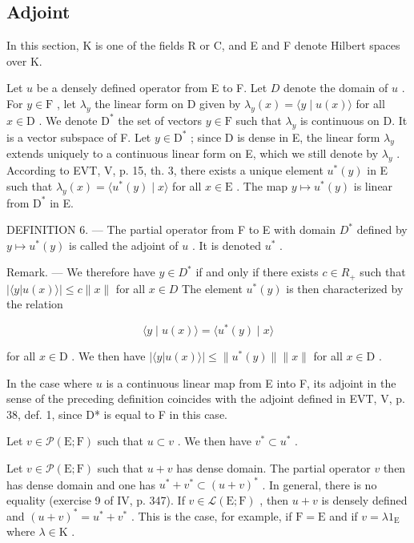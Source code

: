\subsection{Adjoint}

In this section, K is one of the fields R or C, and E and F denote Hilbert spaces over K.

Let \(u\) be a densely defined operator from E to F. Let \(D\) denote the domain of \(u\) . For \(y \in \mathrm{F}\) , let \(\lambda_y\) the linear form on D given by \(\lambda_y(x) = \langle y \mid u(x) \rangle\) for all \(x \in \mathrm{D}\) . We denote \(\mathrm{D}^*\) the set of vectors \(y \in \mathrm{F}\) such that \(\lambda_y\) is continuous on D. It is a vector subspace of F. Let \(y \in \mathrm{D}^*\) ; since D is dense in E, the linear form \(\lambda_y\) extends uniquely to a continuous linear form on E, which we still denote by \(\lambda_y\) . According to EVT, V, p. 15, th. 3, there exists a unique element \(u^*(y)\) in E such that \(\lambda_y(x) = \langle u^*(y) \mid x \rangle\) for all \(x \in \mathrm{E}\) . The map \(y \mapsto u^*(y)\) is linear from \(\mathrm{D}^*\) in E.

DEFINITION 6. --- The partial operator from F to E with domain \(D^*\) defined by \(y \mapsto u^*(y)\) is called the adjoint of \(u\) . It is denoted \(u^*\) .

Remark. --- We therefore have \(y \in D^{*}\) if and only if there exists \(c \in R_{+}\) such that \(|\langle y | u(x) \rangle| \leqslant c \|x\|\) for all \(x \in D\) The element \(u^{*}(y)\) is then characterized by the relation

\[
\langle y \mid u (x) \rangle = \langle u ^ {*} (y) \mid x \rangle\tag{1}
\]

for all \(x \in \mathrm{D}\) . We then have \(|\langle y | u(x) \rangle| \leqslant \| u^{*}(y) \| \| x \|\) for all \(x \in \mathrm{D}\) .

In the case where \(u\) is a continuous linear map from E into F, its adjoint in the sense of the preceding definition coincides with the adjoint defined in EVT, V, p. 38, def. 1, since D* is equal to F in this case.

Let \(v \in \mathcal{P}(\mathrm{E};\mathrm{F})\) such that \(u \subset v\) . We then have \(v^{*} \subset u^{*}\) .

Let \(v \in \mathcal{P}(\mathrm{E};\mathrm{F})\) such that \(u + v\) has dense domain. The partial operator \(v\) then has dense domain and one has \(u^{*} + v^{*} \subset (u + v)^{*}\) . In general, there is no equality (exercise 9 of IV, p. 347). If \(v \in \mathcal{L}(\mathrm{E};\mathrm{F})\) , then \(u + v\) is densely defined and \((u + v)^{*} = u^{*} + v^{*}\) . This is the case, for example, if \(\mathrm{F} = \mathrm{E}\) and if \(v = \lambda 1_{\mathrm{E}}\) where \(\lambda \in \mathrm{K}\) .

